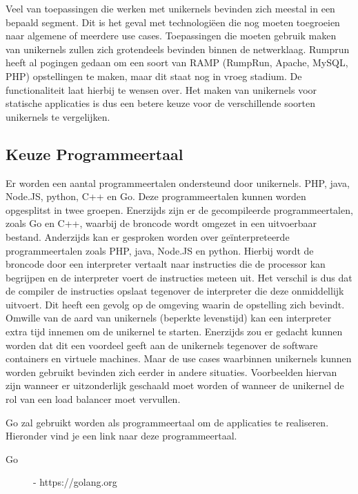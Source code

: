 Veel van toepassingen die werken met unikernels bevinden zich meestal in een bepaald segment. Dit is het geval met technologiëen die nog moeten toegroeien naar algemene of meerdere use cases. Toepassingen die moeten gebruik maken van unikernels zullen zich grotendeels bevinden binnen de netwerklaag. Rumprun heeft al pogingen gedaan om een soort van RAMP (RumpRun, Apache, MySQL, PHP) opstellingen te maken, maar dit staat nog in vroeg stadium. De functionaliteit laat hierbij te wensen over. Het maken van unikernels voor statische applicaties is dus een betere keuze voor de verschillende soorten unikernels te vergelijken.

\subsection{Keuze Programmeertaal}

Er worden een aantal programmeertalen ondersteund door unikernels. PHP, java, Node.JS, python, C++ en Go. Deze programmeertalen kunnen worden opgesplitst in twee groepen. Enerzijds zijn er de gecompileerde programmeertalen, zoals Go en C++, waarbij de broncode wordt omgezet in een uitvoerbaar bestand. Anderzijds kan er gesproken worden over geïnterpreteerde programmeertalen zoals PHP, java, Node.JS en python. Hierbij wordt de broncode door een interpreter vertaalt naar instructies die de processor kan begrijpen en de interpreter voert de instructies meteen uit. Het verschil is dus dat de compiler de instructies opslaat tegenover de interpreter die deze onmiddellijk uitvoert. Dit heeft een gevolg op de omgeving waarin de opstelling zich bevindt. Omwille van de aard van unikernels (beperkte levenstijd) kan een interpreter extra tijd innemen om de unikernel te starten. Enerzijds zou er gedacht kunnen worden dat dit een voordeel geeft aan de unikernels tegenover de software containers en virtuele machines. Maar de use cases waarbinnen unikernels kunnen worden gebruikt bevinden zich eerder in andere situaties. Voorbeelden hiervan zijn wanneer er uitzonderlijk geschaald moet worden of wanneer de unikernel de rol van een load balancer moet vervullen. 

Go zal gebruikt worden als programmeertaal om de applicaties te realiseren. Hieronder vind je een link naar deze programmeertaal.

\begin{description}
\item [Go] - https://golang.org
\end{description}

